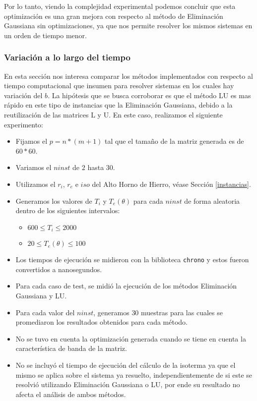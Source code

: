 Por lo tanto, viendo la complejidad experimental podemos concluir que esta optimización es una gran mejora con respecto al método de Eliminación Gaussiana sin optimizaciones, ya que nos permite resolver los mismos sistemas en un orden de tiempo menor.

\subsubsection{Variación a lo largo del tiempo}

En esta sección nos interesa comparar los métodos implementados con respecto al tiempo computacional que insumen para resolver sistemas en los cuales hay variación del $b$.
La hipótesis que se busca corroborar es que el método LU es mas rápido en este tipo de instancias que la Eliminación Gaussiana, debido a la reutilización de las matrices L y U.
\newline
\newline
En este caso, realizamos el siguiente experimento:
\begin{itemize}
    \item Fijamos el $p = n*(m+1)$ tal que el tamaño de la matriz generada es de $60*60$.
    \item Variamos el $ninst$ de $2$ hasta $30$.
    \item Utilizamos el $r_i$, $r_e$ e $iso$ del Alto Horno de Hierro, véase Sección \ref{instancias}.
    \item Generamos los valores de $T_{i}$ y $T_{e}(\theta)$ para cada $ninst$ de forma aleatoria dentro de los siguientes intervalos:
    \begin{itemize}
      \item $600 \leq T_{i} \leq 2000$
      \item $20 \leq T_{e}(\theta) \leq 100$
    \end{itemize}
    \item Los tiempos de ejecución se midieron con la biblioteca \texttt{chrono} y estos fueron convertidos a nanosegundos.
    \item Para cada caso de test, se midió la ejecución de los métodos Eliminación Gaussiana y LU.
    \item Para cada valor del $ninst$, generamos $30$ muestras para las cuales se promediaron los resultados obtenidos para cada método.
    \item No se tuvo en cuenta la optimización generada cuando se tiene en cuenta la característica de banda de la matriz.
	\item No se incluyó el tiempo de ejecución del cálculo de la isoterma ya que
		el mismo se aplica sobre el sistema ya resuelto,
		independientemente de si este se resolvió utilizando Eliminación
		Gaussiana o LU, por ende su resultado no afecta el análisis de ambos
		métodos.
\end{itemize}


